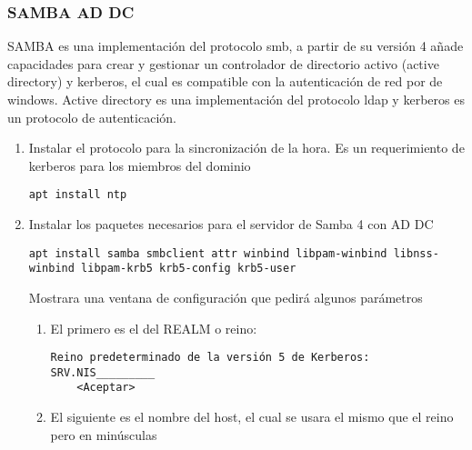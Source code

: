 \documentclass[../main.tex]{subfiles}
\begin{document}
\subsubsection{SAMBA AD DC}\label{sec:samba_addc}

SAMBA es una implementación del protocolo smb, a partir de su
versión 4 añade capacidades para crear y gestionar un controlador
de directorio activo (active directory) y kerberos, el cual es
compatible con la autenticación de red por de windows. Active
directory es una implementación del protocolo ldap y kerberos
es un protocolo de autenticación.

\begin{enumerate}
\item Instalar el protocolo para la sincronización de la hora.
  Es un requerimiento de kerberos para los miembros del dominio

  \begin{listing}[H]
  \begin{verbatim}
apt install ntp
\end{verbatim}
\end{listing}

  \item Instalar los paquetes necesarios para el servidor de
    Samba 4 con AD DC

    \begin{listing}[H]
  \begin{verbatim}
apt install samba smbclient attr winbind libpam-winbind libnss-winbind libpam-krb5 krb5-config krb5-user
\end{verbatim}
\end{listing}

  Mostrara una ventana de configuración que pedirá algunos parámetros

  \begin{enumerate}
  \item El primero es el del REALM o reino:

    \begin{listing}[H]
  \begin{verbatim}
Reino predeterminado de la versión 5 de Kerberos:
SRV.NIS_________
    <Aceptar>
  \end{verbatim}
\end{listing}

  
   \item El siguiente es el nombre del host, el cual se usara el mismo
     que el reino pero en minúsculas


\end{enumerate}
\end{enumerate}
\end{document}

